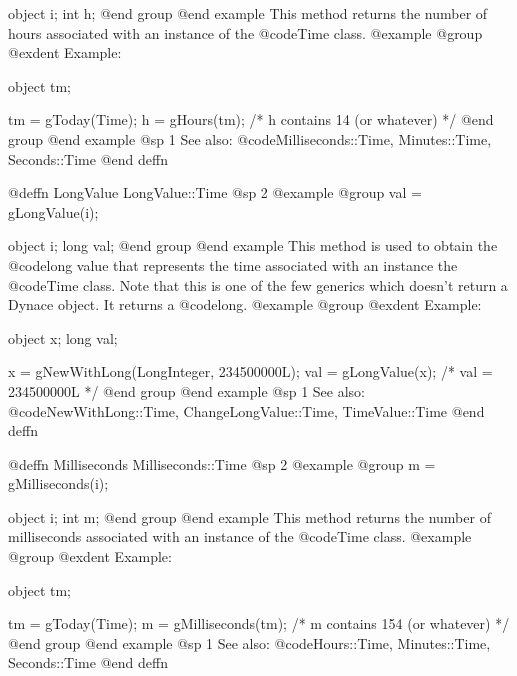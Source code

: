 object  i;
int     h;
@end group
@end example
This method returns the number of hours associated with an
instance of the @code{Time} class.
@example
@group
@exdent Example:

object  tm;

tm = gToday(Time);
h = gHours(tm);   /*  h contains 14 (or whatever)  */
@end group
@end example
@sp 1
See also:  @code{Milliseconds::Time, Minutes::Time, Seconds::Time}
@end deffn
















@deffn {LongValue} LongValue::Time
@sp 2
@example
@group
val = gLongValue(i);

object  i;
long    val;
@end group
@end example
This method is used to obtain the @code{long} value that represents
the time associated with an instance the @code{Time} class.  Note that
this is one of the few generics which doesn't return a Dynace object.
It returns a @code{long}.
@example
@group
@exdent Example:

object  x;
long    val;

x = gNewWithLong(LongInteger, 234500000L);
val = gLongValue(x);    /*  val = 234500000L  */
@end group
@end example
@sp 1
See also:  @code{NewWithLong::Time, ChangeLongValue::Time, TimeValue::Time}
@end deffn










@deffn {Milliseconds} Milliseconds::Time
@sp 2
@example
@group
m = gMilliseconds(i);

object  i;
int     m;
@end group
@end example
This method returns the number of milliseconds associated with an
instance of the @code{Time} class.
@example
@group
@exdent Example:

object  tm;

tm = gToday(Time);
m = gMilliseconds(tm);   /*  m contains 154 (or whatever)  */
@end group
@end example
@sp 1
See also:  @code{Hours::Time, Minutes::Time, Seconds::Time}
@end deffn
















